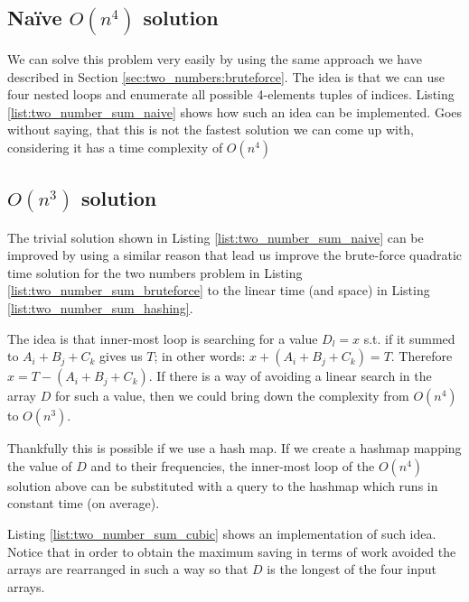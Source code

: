 \subsection{Na\"ive $O(n^4)$ solution}
We can solve this problem very easily by using the same approach we have described in Section \ref{sec:two_numbers:bruteforce}.
The idea is that we can use four nested loops and enumerate all possible 4-elements tuples of indices. Listing \ref{list:two_number_sum_naive} shows how such an idea can be implemented.
Goes without saying, that this is not the fastest solution we can come up with, considering it has a time complexity of $O(n^4)$




\subsection{$O(n^3)$ solution}
The trivial solution shown in Listing \ref{list:two_number_sum_naive} can be improved by using a similar reason that lead us improve the brute-force 
quadratic time solution for the two numbers problem in Listing \ref{list:two_number_sum_bruteforce} to the linear time (and space) in Listing \ref{list:two_number_sum_hashing}.


The idea is that inner-most loop is searching for a value $D_l = x$  s.t. if it summed to $A_i+B_j+C_k$ gives us $T$; in other words: $x+(A_i+B_j+C_k)=T$.
Therefore $x = T-(A_i+B_j+C_k)$. If there is a way of avoiding a linear search in the array $D$ for such a value, then we could bring down the complexity from $O(n^4)$ to $O(n^3)$.

Thankfully this is possible if we use a hash map. If we create a hashmap mapping the value of $D$ and to their frequencies, the inner-most loop of the $O(n^4)$ solution above can be substituted with a query to the hashmap which runs in constant time (on average). 

Listing \ref{list:two_number_sum_cubic} shows an implementation of such idea. 
Notice that in order to obtain the maximum saving in terms of work avoided the arrays are rearranged in such a way so that $D$ 
is the longest of the four input arrays. 




